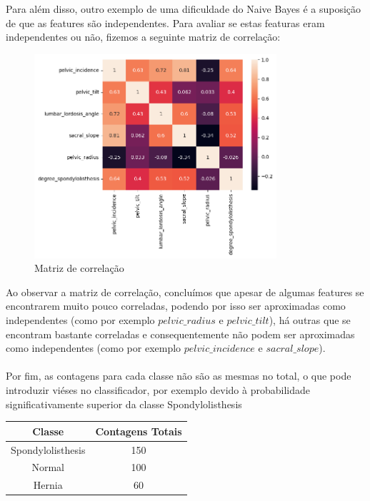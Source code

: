 \documentclass[a4paper,12pt]{article} %
\begin{document}
\begin{enumerate}
Para além disso, outro exemplo de uma dificuldade do Naive Bayes é a suposição de que as features são independentes. Para avaliar 
se estas featuras eram independentes ou não, fizemos a seguinte matriz de correlação:

\begin{figure}[H]
    \centering
    \includegraphics[width=0.8\textwidth]{ex3_3_coormatrix.png}
    \caption{Matriz de correlação}
    \label{fig:ex3_corr}
\end{figure}

Ao observar a matriz de correlação, concluímos que apesar de algumas features se encontrarem muito pouco
correladas, podendo por isso ser aproximadas como independentes (como por exemplo $pelvic\_radius$ e $pelvic\_tilt$), há outras
que se encontram bastante correladas e consequentemente não podem ser aproximadas como independentes (como por exemplo $pelvic\_incidence$ e $sacral\_slope$).
\\ \\
Por fim, as contagens para cada classe não são as mesmas no total, o que pode introduzir viéses no classificador, por exemplo devido à probabilidade significativamente superior da classe Spondylolisthesis

\begin{table}[H]
    \centering
    \begin{tabular}{|c|c|}
        \hline 
        Classe & Contagens Totais \\ \hline
        Spondylolisthesis & 150 \\ \hline
        Normal & 100 \\ \hline
        Hernia & 60 \\ \hline
    \end{tabular}
\end{table}


\end{enumerate}
\end{document}
